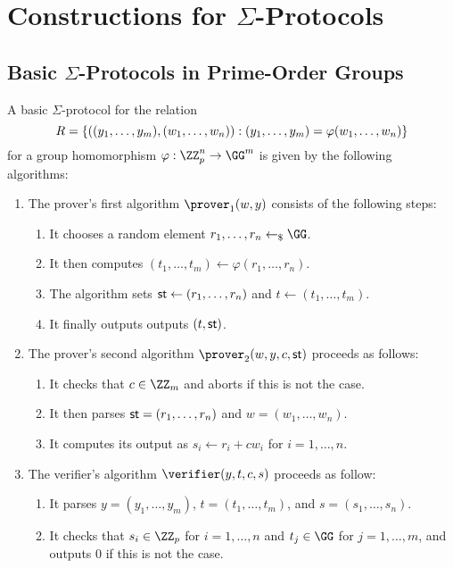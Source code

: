 \documentclass[runningheads]{llncs}
\begin{document}
\section{Constructions for $\Sigma$-Protocols}
\subsection{Basic $\Sigma$-Protocols in Prime-Order Groups}
A basic $\Sigma$-protocol for the relation 
$$R=\{((y_1,\dots,y_m),(w_1,\dots,w_n)) : (y_1,\dots,y_m)=\varphi(w_1,\dots,w_n)\}$$
 for a group homomorphism $\varphi:\ZZ_p^n\to\GG^m$ is given by the following algorithms:

\begin{enumerate}
  \item\label{item:basic:p1}
    The prover's first algorithm $\prover_1(w,y)$ consists of the following steps:
    \begin{enumerate}
      \item\label{item:basic:p1:randomness}
        It chooses a random element $r_1,\dots,r_n\getsr\GG$.
      \item
        It then computes $(t_1,\dots,t_m)\gets\varphi(r_1,\dots,r_n)$.
      \item
	The algorithm sets $\mathsf{st}\gets (r_1,\dots,r_n)$ and $t\gets(t_1,\dots,t_m)$.
      \item
        It finally outputs outputs $(t,\mathsf{st})$.
    \end{enumerate}
  \item\label{item:basic:p2}
    The prover's second algorithm $\prover_2(w,y,c,\st)$ proceeds as follows:
    \begin{enumerate}
      \item
        It checks that $c\in\ZZ_m$ and aborts if this is not the case.
      \item
	It then parses $\mathsf{st}=(r_1,\dots,r_n)$ and $w=(w_1,\dots,w_n)$.
      \item
        It computes its output as $s_i\gets r_i+cw_i$ for $i=1,\dots,n$.
    \end{enumerate}
  \item\label{item:basic:v}
    The verifier's algorithm $\verifier(y,t,c,s)$ proceeds as follow:
    \begin{enumerate}
      \item
        It parses $y=(y_1,\dots,y_m)$, $t=(t_1,\dots,t_m)$, and $s=(s_1,\dots,s_n)$.
      \item\label{item:basic:v:checks}
        It checks that $s_i\in\ZZ_p$ for $i=1,\dots,n$ and $t_j\in\GG$ for $j=1,\dots,m$, and outputs $0$ if this is not the case.

\end{enumerate}
\end{enumerate}
\end{document}
